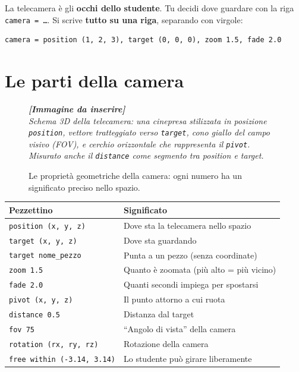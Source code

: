 ﻿\documentclass[a4paper,12pt,oneside]{book}
\newcommand{\kw}[1]{\texttt{\color{keycolor}#1}}
\newcommand{\val}[1]{\texttt{\color{cvtgreen}#1}}
\newcommand{\imgph}[2]{%
  \begin{tcolorbox}[colback=cvtlightblue!30,colframe=cvtblue!40,%
    width=#1,halign=center,valign=center,height=5cm,boxrule=0.5pt,arc=3pt]%
    \textcolor{cvtgray}{\itshape\footnotesize\textbf{[Immagine da inserire]}\\[3pt]#2}%
  \end{tcolorbox}}
\begin{document}
La telecamera è gli \textbf{occhi dello studente}. Tu decidi dove guardare con la
riga \kw{camera = \ldots}. Si scrive \textbf{tutto su una riga}, separando con
virgole:

\begin{lstlisting}
camera = position (1, 2, 3), target (0, 0, 0), zoom 1.5, fade 2.0
\end{lstlisting}

\section{Le parti della camera}

\begin{figure}[H]
  \centering
  \imgph{12cm}{Schema 3D della telecamera: una cinepresa stilizzata in posizione \texttt{position}, vettore tratteggiato verso \texttt{target}, cono giallo del campo visivo (FOV), e cerchio orizzontale che rappresenta il \texttt{pivot}. Misurato anche il \texttt{distance} come segmento tra position e target.}
  \caption{Le proprietà geometriche della camera: ogni numero ha un significato preciso nello spazio.}
  \label{fig:camera-geometria}
\end{figure}

\begin{longtable}{@{}lp{10cm}@{}}
\toprule
\textbf{Pezzettino} & \textbf{Significato} \\
\midrule
\val{position (x, y, z)}      & Dove sta la telecamera nello spazio \\
\val{target (x, y, z)}        & Dove sta guardando \\
\val{target nome\_pezzo}      & Punta a un pezzo (senza coordinate) \\
\val{zoom 1.5}                & Quanto è zoomata (più alto = più vicino) \\
\val{fade 2.0}                & Quanti secondi impiega per spostarsi \\
\val{pivot (x, y, z)}         & Il punto attorno a cui ruota \\
\val{distance 0.5}            & Distanza dal target \\
\val{fov 75}                  & ``Angolo di vista'' della camera \\
\val{rotation (rx, ry, rz)}   & Rotazione della camera \\
\val{free within (-3.14, 3.14)} & Lo studente può girare liberamente \\
\bottomrule
\end{longtable}
\end{document}
